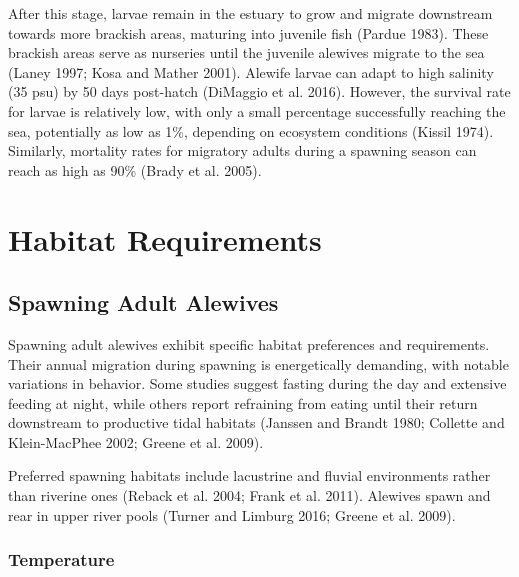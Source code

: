 \documentclass[
]{book}
\begin{document}
After this stage, larvae remain in the estuary to grow and migrate downstream towards more brackish areas, maturing into juvenile fish (Pardue 1983). These brackish areas serve as nurseries until the juvenile alewives migrate to the sea (Laney 1997; Kosa and Mather 2001). Alewife larvae can adapt to high salinity (35 psu) by 50 days post-hatch (DiMaggio et al. 2016). However, the survival rate for larvae is relatively low, with only a small percentage successfully reaching the sea, potentially as low as 1\%, depending on ecosystem conditions (Kissil 1974). Similarly, mortality rates for migratory adults during a spawning season can reach as high as 90\% (Brady et al. 2005).

\hypertarget{habitat-requirements}{%
\section{Habitat Requirements}\label{habitat-requirements}}

\hypertarget{spawning-adult-alewives}{%
\subsection{Spawning Adult Alewives}\label{spawning-adult-alewives}}

Spawning adult alewives exhibit specific habitat preferences and requirements. Their annual migration during spawning is energetically demanding, with notable variations in behavior. Some studies suggest fasting during the day and extensive feeding at night, while others report refraining from eating until their return downstream to productive tidal habitats (Janssen and Brandt 1980; Collette and Klein-MacPhee 2002; Greene et al. 2009).

Preferred spawning habitats include lacustrine and fluvial environments rather than riverine ones (Reback et al. 2004; Frank et al. 2011). Alewives spawn and rear in upper river pools (Turner and Limburg 2016; Greene et al. 2009).

\hypertarget{temperature}{%
\subsubsection{Temperature}\label{temperature}}
\end{document}

